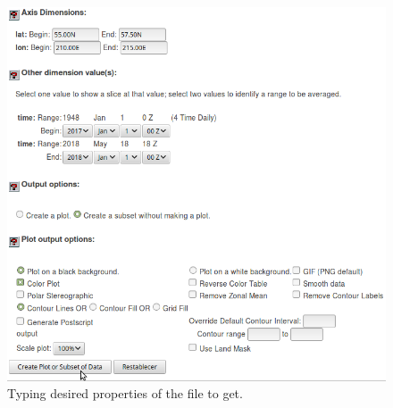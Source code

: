 \begin{onehalfspace}
				\begin{figure}[ht!]
					\centering
					\includegraphics[scale=0.50]{figures/selectingProperties.png}
					\caption{Typing desired properties of the file to get.}
					\label{fig:selectingProperties.png}
				\end{figure}
				
				\clearpage
				
	\end{onehalfspace}
	


